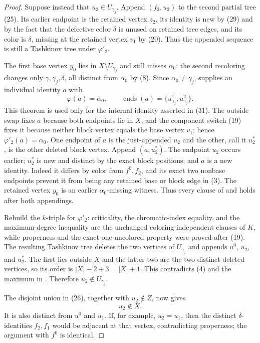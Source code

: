 \begin{proof}
Suppose instead that $u_2\in U_{\gamma_j}$.  Append
$(f_2,u_2)$ to the second partial tree (25).  Its earlier endpoint is the
retained vertex $z_2$, its identity is new by (29) and by the fact that
the defective color $\delta$ is unused on retained tree edges, and its
color is $\delta$, missing at the retained vertex $v_1$ by (20).  Thus
the appended sequence is still a Tashkinov tree under $\varphi'_2$.

The first base vertex $y_0$ lies in
$X\setminus U_{\gamma_j}$ and still misses $\alpha _0$: the second
recoloring changes only $\gamma,\gamma_j,\delta$, all distinct from
$\alpha _0$ by (8).  Since $\alpha _0\ne\gamma_j$,
 supplies an individual identity
$a$ with
\[
 \varphi(a)=\alpha _0,\qquad
 \operatorname{ends}(a)=
   \{u^1_{\gamma_j},u^2_{\gamma_j}\}.                        \tag{31}
\]
This theorem is used only for the internal identity asserted in (31).
The outside swap fixes $a$ because both endpoints lie in $X$, and the
component switch (19) fixes it because neither block vertex equals the
base vertex $v_1$; hence $\varphi'_2(a)=\alpha _0$.  One endpoint of $a$
is the just-appended $u_2$ and the other, call it $u_2^*$, is the other
deleted block vertex.  Append $(a,u_2^*)$.  The endpoint $u_2$ occurs
earlier; $u_2^*$ is new and distinct by the exact block positions; and
$a$ is a new identity.  Indeed it differs by color from $f^0,f_2$, and
its exact two nonbase endpoints prevent it from being any retained base
or block edge in (3).  The retained vertex $y_0$ is an earlier
$\alpha _0$-missing witness.  Thus every clause of
 and  holds after both
appendings.

Rebuild the $k$-triple for $\varphi'_2$: criticality, the chromatic-index
equality, and the maximum-degree inequality are the unchanged
coloring-independent clauses of $K$, while properness and the exact
one-uncolored property were proved after (19).  The resulting Tashkinov
tree deletes the two vertices of $U_{\gamma_j}$ and appends $u^0$,
$u_2$, and $u_2^*$.  The first lies outside $X$ and the latter two are the
two distinct deleted vertices, so its order is $|X|-2+3=|X|+1$.  This
contradicts (4) and the maximum in .  Therefore
$u_2\notin U_{\gamma_j}$.

The disjoint union in (26), together with $u_2\notin Z$, now gives
\[
 u_2\notin X.                                                \tag{32}
\]
It is also distinct from $u^0$ and $u_1$.  If, for example, $u_2=u_1$,
then the distinct $\delta$-identities $f_2,f_1$ would be adjacent at that
vertex, contradicting properness; the argument with $f^0$ is identical.


\end{proof}
